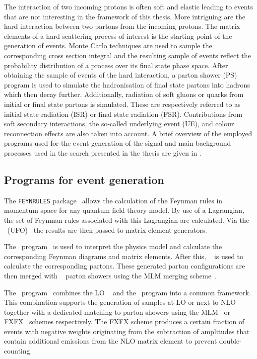 The interaction of two incoming protons is often soft and elastic leading to events that are not interesting in the framework of this thesis. More intriguing are the hard interaction between two partons from the incoming protons. The matrix elements   of a hard scattering process of interest is the starting point of the generation of events. Monte Carlo techniques are used to sample the corresponding cross section integral and the resulting sample of events reflect the probability distribution of a process over its final state phase space. After obtaining the sample of events of the hard interaction, a parton shower (PS) program is used to simulate the hadronisation of final state partons into hadrons which then  decay further. Additionally, radiation of soft gluons or quarks from initial or final state partons is simulated. These are respectively referred to as initial state radiation (ISR) or final state radiation (FSR). Contributions from soft secondary interactions, the so-called underlying event (UE), and colour reconnection effects are also taken into account. 
A brief overview of the employed programs used for the event generation of the signal and main background processes used in the search presented in the thesis are given in .

\subsection{Programs for event generation}
\label{sec:programs}
The \texttt{FEYNRULES} package~\cite{Alloul:2013bka} allows the calculation of  the Feynman rules in momentum space for any quantum field theory model. By use of a Lagrangian, the set of Feynman rules associated with this Lagrangian are calculated. Via the \UFO\ (UFO)~\cite{Degrande:2011ua} the results are then passed to matrix element generators. 


The \MG\  program~\cite{Alwall:2011uj} is used to interpret the physics model and calculate the corresponding Feynman diagrams and matrix elements. After this, \ME~\cite{Mangano:2006rw} is used to calculate the corresponding partons. These generated parton configurations are then merged with \Pythia~\cite{Sjostrand2015159,Sjostrand:2006za,Sjostrand:2014zea} parton showers using the MLM merging scheme~\cite{Alwall:2007fs}. 

The \aMCMG\ program~\cite{Alwall:2014hca} combines the LO \MG~\cite{Alwall:2011uj} and the \aMC\ program into a common framework. This combination supports the generation of samples at LO or next to NLO together with a dedicated matching to parton showers  using the MLM~\cite{Alwall:2007fs} or FXFX~\cite{Frederix:2012ps} schemes respectively. The FXFX scheme produces a certain fraction of events with negative weights originating from the subtraction of amplitudes that contain additional emissions from the NLO matrix element to prevent double-counting.



